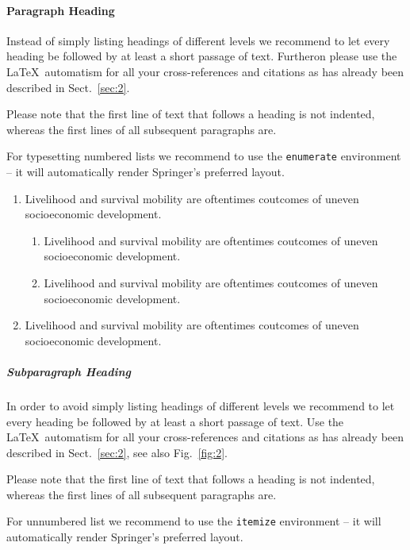 \paragraph{Paragraph Heading} %
Instead of simply listing headings of different levels we recommend to let every heading be followed by at least a short passage of text. Furtheron please use the \LaTeX\ automatism for all your cross-references and citations as has already been described in Sect.~\ref{sec:2}.

Please note that the first line of text that follows a heading is not indented, whereas the first lines of all subsequent paragraphs are.

For typesetting numbered lists we recommend to use the \verb|enumerate| environment -- it will automatically render Springer's preferred layout.

\begin{enumerate}
    \item{Livelihood and survival mobility are oftentimes coutcomes of uneven socioeconomic development.}
          \begin{enumerate}
              \item{Livelihood and survival mobility are oftentimes coutcomes of uneven socioeconomic development.}
              \item{Livelihood and survival mobility are oftentimes coutcomes of uneven socioeconomic development.}
          \end{enumerate}
    \item{Livelihood and survival mobility are oftentimes coutcomes of uneven socioeconomic development.}
\end{enumerate}


\subparagraph{Subparagraph Heading} In order to avoid simply listing headings of different levels we recommend to let every heading be followed by at least a short passage of text. Use the \LaTeX\ automatism for all your cross-references and citations as has already been described in Sect.~\ref{sec:2}, see also Fig.~\ref{fig:2}.

Please note that the first line of text that follows a heading is not indented, whereas the first lines of all subsequent paragraphs are.

For unnumbered list we recommend to use the \verb|itemize| environment -- it will automatically render Springer's preferred layout.

